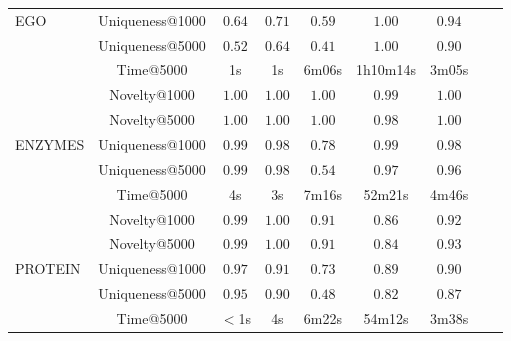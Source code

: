 \begin{table}[h!]
\begin{tabular}{lcccccccc}
          EGO & Uniqueness@1000       & $0.64$ & $0.71$ & $0.59$          & $\mathbf{1.00}$ & $0.94$\\
          & Uniqueness@5000           & $0.52$ & $0.64$ & $0.41$          & $\mathbf{1.00}$ & $0.90$\\
          & Time@5000                 & 1s       & 1s       & 6m06s             & 1h10m14s          & 3m05s\\
         \midrule
          & Novelty@1000              & $\mathbf{1.00}$ & $\mathbf{1.00}$ & $\mathbf{1.00}$          & $0.99$          & $\mathbf{1.00}$\\
          & Novelty@5000              & $\mathbf{1.00}$ & $\mathbf{1.00}$ & $\mathbf{1.00}$          & $0.98$          & $\mathbf{1.00}$\\
          ENZYMES & Uniqueness@1000   & $0.99$ & $0.98$ & $0.78$          & $\mathbf{0.99}$ & $0.98$\\
          & Uniqueness@5000           & $0.99$ & $0.98$ & $0.54$          & $\mathbf{0.97}$ & $0.96$\\
          & Time@5000                 & 4s       & 3s       & 7m16s             & 52m21s            & 4m46s\\
        \midrule
          & Novelty@1000              & $0.99$ & $\mathbf{1.00}$ & $0.91$          & $0.86$          & $\mathbf{0.92}$\\
          & Novelty@5000              & $0.99$ & $\mathbf{1.00}$ & $0.91$          & $0.84$          & $\mathbf{0.93}$\\
          PROTEIN & Uniqueness@1000  & $0.97$ & $0.91$ & $0.73$          & $0.89$          & $\mathbf{0.90}$\\
          & Uniqueness@5000           & $0.95$ & $0.90$ & $0.48$          & $0.82$          & $\mathbf{0.87}$\\
          & Time@5000                 & $<$1s    & 4s       & 6m22s             & 54m12s            & 3m38s\\
          \bottomrule
    \end{tabular}
\end{table}
